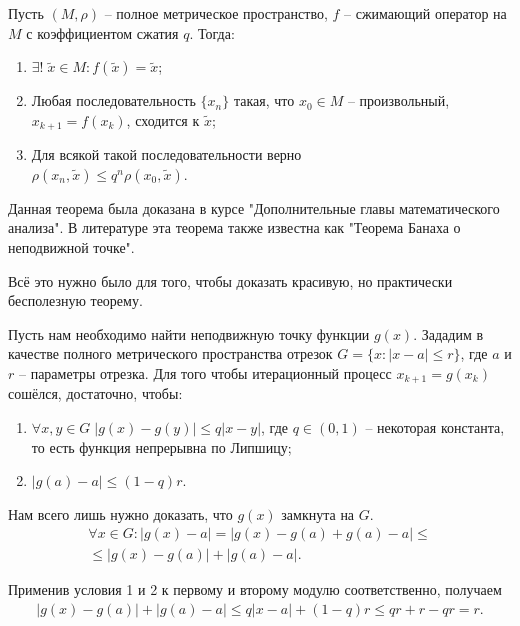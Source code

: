 \documentclass[../main.tex]{subfile}
\begin{document}
\begin{theorem}
	Пусть $(M,\rho)$ -- полное метрическое пространство, $f$ -- сжимающий
	оператор на $M$ с коэффициентом сжатия $q$. Тогда:
	\begin{enumerate}
		\item $\exists!\;\widetilde{x}\in M: f(\widetilde{x})=\widetilde{x}$;
		\item Любая последовательность $\{x_n\}$ такая, что $x_0 \in M$ --
			произвольный, $x_{k+1}=f(x_k)$, сходится к $\widetilde{x}$;
		\item Для всякой такой последовательности верно\\
			$\rho(x_n, \widetilde{x}) \le q ^ n \rho(x_0, \widetilde{x})$.
	\end{enumerate}
\end{theorem}

Данная теорема была доказана в курсе "Дополнительные главы математического анализа"{}.
В литературе эта теорема также известна как "Теорема Банаха о неподвижной точке"{}.

Всё это нужно было для того, чтобы доказать красивую, но практически бесполезную
теорему.

\begin{theorem}
	Пусть нам необходимо найти неподвижную точку функции $g(x)$. Зададим
	в качестве полного метрического пространства отрезок $G=\{x: |x-a| \le r\}$,
	где $a$ и $r$ -- параметры отрезка. Для того чтобы итерационный процесс
	$x_{k+1}=g(x_k)$ сошёлся, достаточно, чтобы:
	\begin{enumerate}
		\item $\forall x,y\in G\;|g(x)-g(y)|\le q|x-y|$, где $q\in(0,1)$ --
			некоторая константа, то есть функция непрерывна по Липшицу;
		\item $|g(a)-a|\le(1-q)r$.
	\end{enumerate}
\end{theorem}

\beginproof

	Нам всего лишь нужно доказать, что $g(x)$ замкнута на $G$.
	\begin{multline*}
		\forall x\in G:|g(x)-a|=|g(x)-g(a)+g(a)-a|\le \\
		\le|g(x)-g(a)|+|g(a)-a|.
	\end{multline*}

	Применив условия 1 и 2 к первому и второму модулю соответственно, получаем
	\begin{align*}
		|g(x)-g(a)|+|g(a)-a|\le q|x-a|+(1-q)r\le qr+r-qr=r.
	\end{align*}
\end{document}
